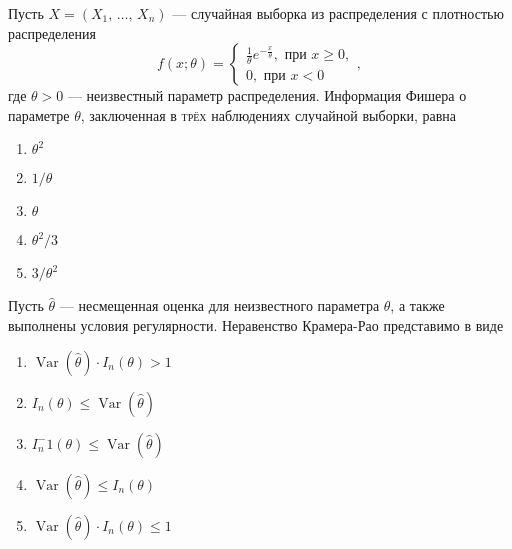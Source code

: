 \documentclass[t]{beamer}
\DeclareMathOperator{\Var}{Var}
\begin{document}
 \begin{frame} \label{24} 
\begin{block}{24} 

    Пусть $X = (X_1, \, \ldots, \, X_n)$ — случайная выборка из распределения с плотностью распределения
  \[
      f(x; \theta) =
      \begin{cases}
          \frac{1}{\theta} e^{-\frac{x}{\theta}}, \text{ при } x \geq 0, \\
          0, \text{ при } x < 0
      \end{cases},
  \]
  где $\theta > 0$ — неизвестный параметр распределения. Информация Фишера о параметре $\theta$, заключенная в \textsc{трёх} наблюдениях случайной выборки, равна


 \end{block} 
\begin{enumerate} 
\item[] \hyperlink{24-No}{\beamergotobutton{} $\theta^2$}
\item[] \hyperlink{24-No}{\beamergotobutton{} $1 / \theta$}
\item[] \hyperlink{24-No}{\beamergotobutton{} $\theta$}
\item[] \hyperlink{24-No}{\beamergotobutton{} $\theta^2 / 3$}
\item[] \hyperlink{24-Yes}{\beamergotobutton{} $3 / \theta^2$}
\end{enumerate} 
\end{frame} 


 \begin{frame} \label{25} 
\begin{block}{25} 

  Пусть $\hat{\theta}$ — несмещенная оценка для неизвестного параметра $\theta$, а также выполнены условия регулярности. Неравенство Крамера-Рао представимо в виде


 \end{block} 
\begin{enumerate} 
\item[] \hyperlink{25-No}{\beamergotobutton{} $\Var(\hat\theta) \cdot I_n(\theta) > 1$}
\item[] \hyperlink{25-No}{\beamergotobutton{} $I_n(\theta) \leq \Var(\hat\theta)$}
\item[] \hyperlink{25-Yes}{\beamergotobutton{} $I_n^-1(\theta) \leq \Var(\hat\theta)$}
\item[] \hyperlink{25-No}{\beamergotobutton{} $\Var(\hat\theta) \leq I_n(\theta)$}
\item[] \hyperlink{25-No}{\beamergotobutton{} $\Var(\hat\theta) \cdot I_n(\theta) \leq 1$}
\end{enumerate} 
\end{frame} 
\end{document}
